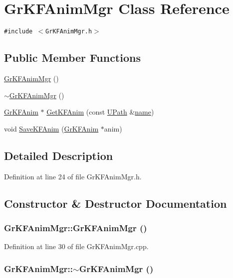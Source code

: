 \hypertarget{class_gr_k_f_anim_mgr}{
\section{GrKFAnimMgr Class Reference}
\label{class_gr_k_f_anim_mgr}
}
{\tt \#include $<$GrKFAnimMgr.h$>$}

\subsection*{Public Member Functions}
\begin{CompactItemize}
\item 
\hyperlink{class_gr_k_f_anim_mgr_24096c6bfab61c91af8468e6647a2381}{GrKFAnimMgr} ()
\item 
\hyperlink{class_gr_k_f_anim_mgr_67e66eeba6d58579b6c298241e49a9d5}{$\sim$GrKFAnimMgr} ()
\item 
\hyperlink{class_gr_k_f_anim}{GrKFAnim} $\ast$ \hyperlink{class_gr_k_f_anim_mgr_bd9ec4d6de5f1bea19523b6352fe1d04}{GetKFAnim} (const \hyperlink{class_u_path}{UPath} \&\hyperlink{glext__bak_8h_bb62efe59ccdd153ce42e1a418352209}{name})
\item 
void \hyperlink{class_gr_k_f_anim_mgr_8b9ac050905522f03b5732ae8d716f09}{SaveKFAnim} (\hyperlink{class_gr_k_f_anim}{GrKFAnim} $\ast$anim)
\end{CompactItemize}


\subsection{Detailed Description}


Definition at line 24 of file GrKFAnimMgr.h.

\subsection{Constructor \& Destructor Documentation}
\hypertarget{class_gr_k_f_anim_mgr_24096c6bfab61c91af8468e6647a2381}{
\subsubsection[{GrKFAnimMgr}]{\setlength{\rightskip}{0pt plus 5cm}GrKFAnimMgr::GrKFAnimMgr ()}}
\label{class_gr_k_f_anim_mgr_24096c6bfab61c91af8468e6647a2381}




Definition at line 30 of file GrKFAnimMgr.cpp.\hypertarget{class_gr_k_f_anim_mgr_67e66eeba6d58579b6c298241e49a9d5}{
\subsubsection[{$\sim$GrKFAnimMgr}]{\setlength{\rightskip}{0pt plus 5cm}GrKFAnimMgr::$\sim$GrKFAnimMgr ()}}
\label{class_gr_k_f_anim_mgr_67e66eeba6d58579b6c298241e49a9d5}




